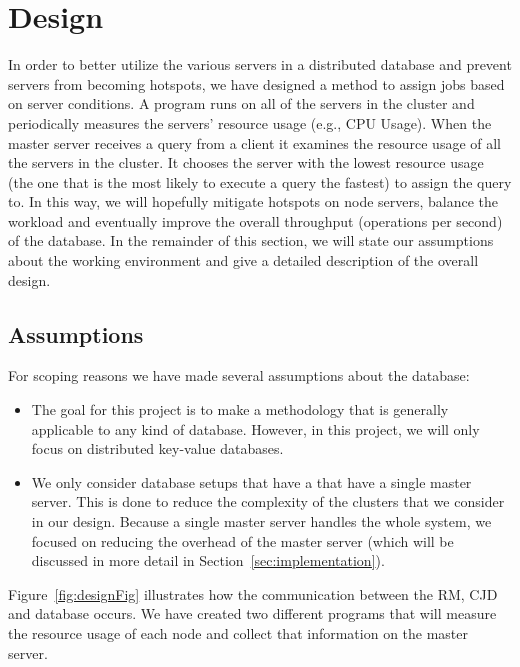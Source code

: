 \section{Design}
\label{sec:design}

In order to better utilize the various servers in a distributed database and prevent servers from becoming hotspots, we have designed a method to assign jobs based on server conditions. A program runs on all of the servers in the cluster and periodically measures the servers' resource usage (e.g., CPU Usage). When the master server receives a query from a client it examines the resource usage of all the servers in the cluster. It chooses the server with the lowest resource usage (the one that is the most likely to execute a query the fastest) to assign the query to. In this way, we will hopefully mitigate hotspots on node servers, balance the workload and eventually improve the overall throughput (operations per second) of the database. In the remainder of this section, we will state our assumptions about the working environment and give a detailed description of the overall design.

\subsection{Assumptions}
For scoping reasons we have made several assumptions about the database:

\begin{itemize}

\item The goal for this project is to make a methodology that is generally applicable to any kind of database. However, in this project, we will only focus on distributed key-value databases.

\item We only consider database setups that have a  that have a single master server. This is done to reduce the complexity of the clusters that we consider in our design. Because a single master server handles the whole system, we focused on reducing the overhead of the master server (which will be discussed in more detail in Section~\ref{sec:implementation}).

\end{itemize}

Figure~\ref{fig:designFig} illustrates how the communication between the RM, CJD and database occurs. We have created two different programs that will measure the resource usage of each node and collect that information on the master server.

